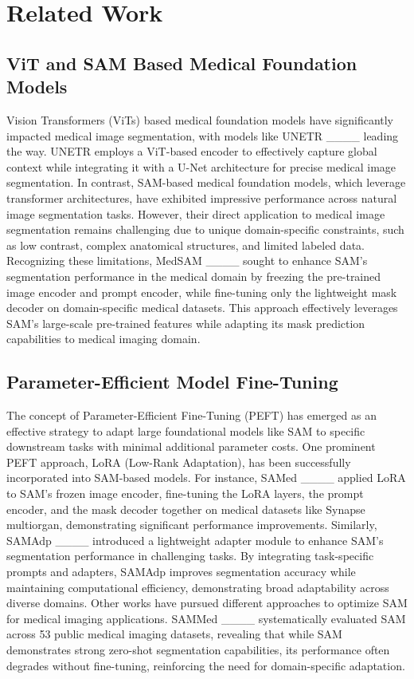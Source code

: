 \section{Related Work}
\subsection{ViT and SAM Based Medical Foundation Models}

\par Vision Transformers (ViTs) based medical foundation models have significantly impacted medical image segmentation, with models like UNETR ____ leading the way. UNETR employs a ViT-based encoder to effectively capture global context while integrating it with a U-Net architecture for precise medical image segmentation. In contrast, SAM-based medical foundation models, which leverage transformer architectures, have exhibited impressive performance across natural image segmentation tasks. However, their direct application to medical image segmentation remains challenging due to unique domain-specific constraints, such as low contrast, complex anatomical structures, and limited labeled data. Recognizing these limitations, MedSAM ____ sought to enhance SAM’s segmentation performance in the medical domain by freezing the pre-trained image encoder and prompt encoder, while fine-tuning only the lightweight mask decoder on domain-specific medical datasets. This approach effectively leverages SAM’s large-scale pre-trained features while adapting its mask prediction capabilities to medical imaging domain.

\subsection{Parameter-Efficient Model Fine-Tuning}
The concept of Parameter-Efficient Fine-Tuning (PEFT) has emerged as an effective strategy to adapt large foundational models like SAM to specific downstream tasks with minimal additional parameter costs. One prominent PEFT approach, LoRA (Low-Rank Adaptation), has been successfully incorporated into SAM-based models. For instance, SAMed ____ applied LoRA to SAM’s frozen image encoder, fine-tuning the LoRA layers, the prompt encoder, and the mask decoder together on medical datasets like Synapse multiorgan, demonstrating significant performance improvements. Similarly, SAMAdp ____ introduced a lightweight adapter module to enhance SAM's segmentation performance in challenging tasks. By integrating task-specific prompts and adapters, SAMAdp improves segmentation accuracy while maintaining computational efficiency, demonstrating broad adaptability across diverse domains. Other works have pursued different approaches to optimize SAM for medical imaging applications. SAMMed ____ systematically evaluated SAM across 53 public medical imaging datasets, revealing that while SAM demonstrates strong zero-shot segmentation capabilities, its performance often degrades without fine-tuning, reinforcing the need for domain-specific adaptation.

